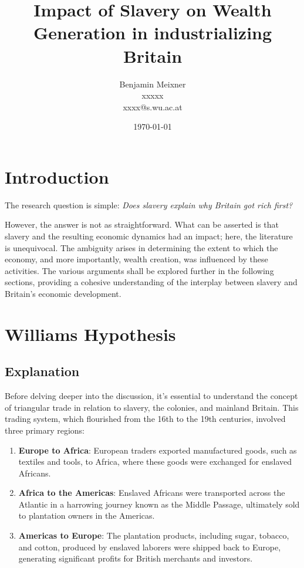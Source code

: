 \documentclass[a4paper,11pt]{article}
\begin{document}
\title{Impact of Slavery on Wealth Generation in industrializing Britain}
\author{Benjamin Meixner \\ xxxxx \\ xxxx@s.wu.ac.at}
\date{\today} %
\maketitle

\pagebreak

\tableofcontents

\pagebreak

\section*{Introduction}

The research question is simple: \qquad \textit{Does slavery explain why Britain got rich first?}

However, the answer is not as straightforward. What can be asserted is that slavery and the resulting economic dynamics had an impact; here, the literature is unequivocal. The ambiguity arises in determining the extent to which the economy, and more importantly, wealth creation, was influenced by these activities. The various arguments shall be explored further in the following sections, providing a cohesive understanding of the interplay between slavery and Britain's economic development.

\section{Williams Hypothesis}
\subsection{Explanation}

Before delving deeper into the discussion, it's essential to understand the concept of triangular trade in relation to slavery, the colonies, and mainland Britain. This trading system, which flourished from the 16th to the 19th centuries, involved three primary regions:

\begin{enumerate}
    \item \textbf{Europe to Africa}: European traders exported manufactured goods, such as textiles and tools, to Africa, where these goods were exchanged for enslaved Africans.

    \item \textbf{Africa to the Americas}: Enslaved Africans were transported across the Atlantic in a harrowing journey known as the Middle Passage, ultimately sold to plantation owners in the Americas.

    \item \textbf{Americas to Europe}: The plantation products, including sugar, tobacco, and cotton, produced by enslaved laborers were shipped back to Europe, generating significant profits for British merchants and investors.
\end{enumerate}
\end{document}
